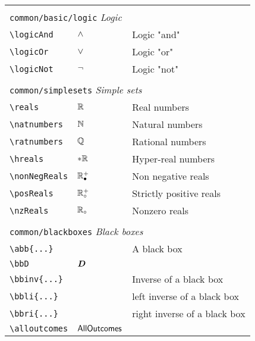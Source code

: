 \begin{longtable}{lll}
  &  & \\ 
 \multicolumn{3}{l}{{\color[rgb]{0.5,0.5,0.5}\texttt{common/basic/logic}} \emph{Logic}}\\ 
 \hline
{\color[rgb]{0.5,0.5,0.5}\texttt{\textbackslash logicAnd}} & $\wedge$ &  Logic "and"\\ 
 {\color[rgb]{0.5,0.5,0.5}\texttt{\textbackslash logicOr}} & $\vee$ &  Logic "or"\\ 
 {\color[rgb]{0.5,0.5,0.5}\texttt{\textbackslash logicNot}} & $\neg$ &  Logic "not"\\ 
  &  & \\ 
 \multicolumn{3}{l}{{\color[rgb]{0.5,0.5,0.5}\texttt{common/simplesets}} \emph{Simple sets}}\\ 
 \hline
{\color[rgb]{0.5,0.5,0.5}\texttt{\textbackslash reals}} & $\mathbb{R}$ &  Real numbers\\ 
 {\color[rgb]{0.5,0.5,0.5}\texttt{\textbackslash natnumbers}} & $\mathbb{N}$ &  Natural numbers\\ 
 {\color[rgb]{0.5,0.5,0.5}\texttt{\textbackslash ratnumbers}} & $\mathbb{Q}$ &  Rational numbers\\ 
 {\color[rgb]{0.5,0.5,0.5}\texttt{\textbackslash hreals}} & $\ast\mathbb{R}$ &  Hyper-real numbers\\ 
 {\color[rgb]{0.5,0.5,0.5}\texttt{\textbackslash nonNegReals}} & $\mathbb{R}^{+}_{\bullet}$ &  Non negative reals \\ 
 {\color[rgb]{0.5,0.5,0.5}\texttt{\textbackslash posReals}} & $\mathbb{R}^{+}_{\circ}$ &  Strictly positive reals\\ 
 {\color[rgb]{0.5,0.5,0.5}\texttt{\textbackslash nzReals}} & $\mathbb{R}_{\circ}$ &  Nonzero reals\\ 
  &  & \\ 
 \multicolumn{3}{l}{{\color[rgb]{0.5,0.5,0.5}\texttt{common/blackboxes}} \emph{Black boxes}}\\ 
 \hline
{\color[rgb]{0.5,0.5,0.5}\texttt{\textbackslash abb\{...\}}} &  &  A black box\\ 
 {\color[rgb]{0.5,0.5,0.5}\texttt{\textbackslash bbD}} & $\boldsymbol{D}$ & \\ 
 {\color[rgb]{0.5,0.5,0.5}\texttt{\textbackslash bbinv\{...\}}} &  &  Inverse of a black box\\ 
 {\color[rgb]{0.5,0.5,0.5}\texttt{\textbackslash bbli\{...\}}} &  &  left inverse of a black box\\ 
 {\color[rgb]{0.5,0.5,0.5}\texttt{\textbackslash bbri\{...\}}} &  &  right inverse of a black box\\ 
 {\color[rgb]{0.5,0.5,0.5}\texttt{\textbackslash alloutcomes}} & $\mathsf{AllOutcomes}$ & \\ 

\end{longtable}
